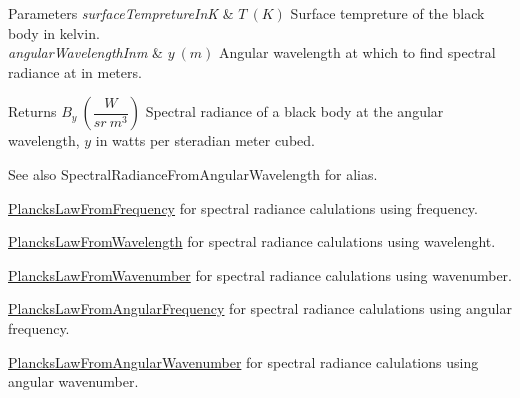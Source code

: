 \begin{DoxyParams}{Parameters}
{\em surface\+Tempreture\+InK} & $T\ (K)$ Surface tempreture of the black body in kelvin. \\
\hline
{\em angular\+Wavelength\+Inm} & $y\ (m)$ Angular wavelength at which to find spectral radiance at in meters. \\
\hline
\end{DoxyParams}
\begin{DoxyReturn}{Returns}
$B_{y}\ ( \dfrac{W}{sr\ m^3})$ Spectral radiance of a black body at the angular wavelength, $y$ in watts per steradian meter cubed. 
\end{DoxyReturn}
\begin{DoxySeeAlso}{See also}
Spectral\+Radiance\+From\+Angular\+Wavelength for alias. 

\mbox{\hyperlink{group___e_g_x_phys-_electrodynamics-_black_body-_plancks_law_ga68aae82f8a086831358c4a61c8c80ba4}{Plancks\+Law\+From\+Frequency}} for spectral radiance calulations using frequency. 

\mbox{\hyperlink{group___e_g_x_phys-_electrodynamics-_black_body-_plancks_law_ga54639bc031ded51ef78aa82b0457a4dd}{Plancks\+Law\+From\+Wavelength}} for spectral radiance calulations using wavelenght. 

\mbox{\hyperlink{group___e_g_x_phys-_electrodynamics-_black_body-_plancks_law_ga6648ae2a0fbff6735c1e1a04c7cac746}{Plancks\+Law\+From\+Wavenumber}} for spectral radiance calulations using wavenumber. 

\mbox{\hyperlink{group___e_g_x_phys-_electrodynamics-_black_body-_plancks_law_gaac540560c71e30c02b91d22e417b5863}{Plancks\+Law\+From\+Angular\+Frequency}} for spectral radiance calulations using angular frequency. 

\mbox{\hyperlink{group___e_g_x_phys-_electrodynamics-_black_body-_plancks_law_gaa3d3e0fdb77d25bdd40523f9975de902}{Plancks\+Law\+From\+Angular\+Wavenumber}} for spectral radiance calulations using angular wavenumber. 
\end{DoxySeeAlso}
\mbox{\label{group___e_g_x_phys-_electrodynamics-_black_body-_plancks_law_gaa3d3e0fdb77d25bdd40523f9975de902}} 
